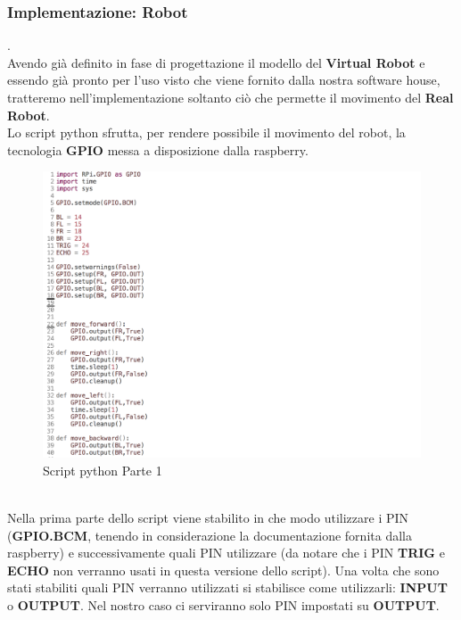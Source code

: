 \documentclass{llncs}
\begin{document}
\subsubsection{Implementazione: Robot} .
\label{ImplementazioneReq1Robot}
\vspace*{1ex}
\\
Avendo gi\`a definito in fase di progettazione il modello del \textbf{Virtual Robot} e essendo gi\`a pronto per l'uso visto che viene fornito dalla nostra software house, tratteremo nell'implementazione soltanto ci\`o che permette il movimento del \textbf{Real Robot}. \\
Lo script python sfrutta, per rendere possibile il movimento del robot, la tecnologia \textbf{GPIO} messa a disposizione dalla raspberry.\\
\begin{figure}
    \centering
    \includegraphics[width=1\textwidth]{Immagini/Scripts/Script(1)req1.png}
    \caption{Script python Parte 1}
    \label{fig:my_label}
\end{figure}
\vspace*{1ex}
\\
Nella prima parte dello script viene stabilito in che modo utilizzare i PIN (\textbf{GPIO.BCM}, tenendo in considerazione la documentazione fornita dalla raspberry) e successivamente quali PIN utilizzare (da notare che i PIN \textbf{TRIG} e \textbf{ECHO} non verranno usati in questa versione dello script). Una volta che sono stati stabiliti quali PIN verranno utilizzati si stabilisce come utilizzarli: \textbf{INPUT} o \textbf{OUTPUT}. Nel nostro caso ci serviranno solo PIN impostati su \textbf{OUTPUT}.\\
\end{document}
